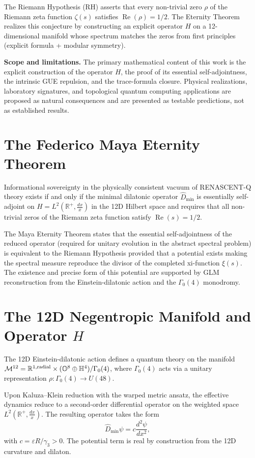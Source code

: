 \documentclass[11pt,a4paper]{article}
\begin{document}
The Riemann Hypothesis (RH) asserts that every non-trivial zero \(\rho\) of the Riemann zeta function \(\zeta(s)\) satisfies \(\operatorname{Re}(\rho) = 1/2\). The Eternity Theorem realizes this conjecture by constructing an explicit operator \(H\) on a 12-dimensional manifold whose spectrum matches the zeros from first principles (explicit formula + modular symmetry).

\textbf{Scope and limitations.} The primary mathematical content of this work is the explicit construction of the operator \(H\), the proof of its essential self-adjointness, the intrinsic GUE repulsion, and the trace-formula closure. Physical realizations, laboratory signatures, and topological quantum computing applications are proposed as natural consequences and are presented as testable predictions, not as established results.

\section{The Federico Maya Eternity Theorem}
Informational sovereignty in the physically consistent vacuum of RENASCENT-Q theory exists if and only if the minimal dilatonic operator \(\hat{D}_{\min}\) is essentially self-adjoint on \(H = L^2(\mathbb{R}^+,\frac{dx}{x})\) in the 12D Hilbert space and requires that all non-trivial zeros of the Riemann zeta function satisfy \(\operatorname{Re}(s) = 1/2\).

The Maya Eternity Theorem states that the essential self-adjointness of the reduced operator (required for unitary evolution in the abstract spectral problem) is equivalent to the Riemann Hypothesis provided that a potential exists making the spectral measure reproduce the divisor of the completed xi-function \(\xi(s)\). The existence and precise form of this potential are supported by GLM reconstruction from the Einstein-dilatonic action and the \(\Gamma_0(4)\) monodromy.

\section{The 12D Negentropic Manifold and Operator \texorpdfstring{$H$}{H}}
The 12D Einstein-dilatonic action defines a quantum theory on the manifold \(\mathcal{M}^{12} = \mathbb{R}^{1,\rm radial} \times (\mathbb{O}^8 \oplus \mathbb{H}^4)/\Gamma_0(4)\), where \(\Gamma_0(4)\) acts via a unitary representation \(\rho : \Gamma_0(4) \to U(48)\).

Upon Kaluza--Klein reduction with the warped metric ansatz, the effective dynamics reduce to a second-order differential operator on the weighted space \(L^2(\mathbb{R}^+,\frac{dx}{x})\). The resulting operator takes the form
\[
\hat{D}_{\min}\psi = c\frac{d^2\psi}{dx^2},
\]
with \(c = \varepsilon R/\gamma_3 > 0\). The potential term is real by construction from the 12D curvature and dilaton.
\end{document}
